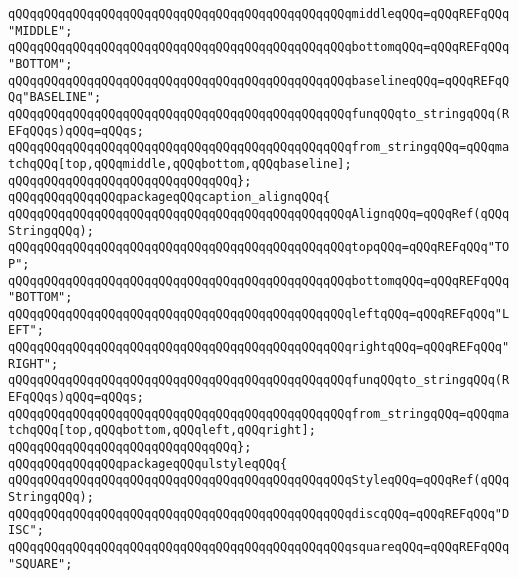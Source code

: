 \verb|qQQqqQQqqQQqqQQqqQQqqQQqqQQqqQQqqQQqqQQqqQQqqQQqmiddleqQQq=qQQqREFqQQq"MIDDLE";|\newline
\verb|qQQqqQQqqQQqqQQqqQQqqQQqqQQqqQQqqQQqqQQqqQQqqQQqbottomqQQq=qQQqREFqQQq"BOTTOM";|\newline
\verb|qQQqqQQqqQQqqQQqqQQqqQQqqQQqqQQqqQQqqQQqqQQqqQQqbaselineqQQq=qQQqREFqQQq"BASELINE";|\newline
\verb|qQQqqQQqqQQqqQQqqQQqqQQqqQQqqQQqqQQqqQQqqQQqqQQqfunqQQqto_stringqQQq(REFqQQqs)qQQq=qQQqs;|\newline
\verb|qQQqqQQqqQQqqQQqqQQqqQQqqQQqqQQqqQQqqQQqqQQqqQQqfrom_stringqQQq=qQQqmatchqQQq[top,qQQqmiddle,qQQqbottom,qQQqbaseline];|\newline
\verb|qQQqqQQqqQQqqQQqqQQqqQQqqQQqqQQq};|\newline
\newline
\verb|qQQqqQQqqQQqqQQqpackageqQQqcaption_alignqQQq{|\newline
\newline
\verb|qQQqqQQqqQQqqQQqqQQqqQQqqQQqqQQqqQQqqQQqqQQqqQQqAlignqQQq=qQQqRef(qQQqStringqQQq);|\newline
\verb|qQQqqQQqqQQqqQQqqQQqqQQqqQQqqQQqqQQqqQQqqQQqqQQqtopqQQq=qQQqREFqQQq"TOP";|\newline
\verb|qQQqqQQqqQQqqQQqqQQqqQQqqQQqqQQqqQQqqQQqqQQqqQQqbottomqQQq=qQQqREFqQQq"BOTTOM";|\newline
\verb|qQQqqQQqqQQqqQQqqQQqqQQqqQQqqQQqqQQqqQQqqQQqqQQqleftqQQq=qQQqREFqQQq"LEFT";|\newline
\verb|qQQqqQQqqQQqqQQqqQQqqQQqqQQqqQQqqQQqqQQqqQQqqQQqrightqQQq=qQQqREFqQQq"RIGHT";|\newline
\verb|qQQqqQQqqQQqqQQqqQQqqQQqqQQqqQQqqQQqqQQqqQQqqQQqfunqQQqto_stringqQQq(REFqQQqs)qQQq=qQQqs;|\newline
\verb|qQQqqQQqqQQqqQQqqQQqqQQqqQQqqQQqqQQqqQQqqQQqqQQqfrom_stringqQQq=qQQqmatchqQQq[top,qQQqbottom,qQQqleft,qQQqright];|\newline
\verb|qQQqqQQqqQQqqQQqqQQqqQQqqQQqqQQq};|\newline
\newline
\verb|qQQqqQQqqQQqqQQqpackageqQQqulstyleqQQq{|\newline
\newline
\verb|qQQqqQQqqQQqqQQqqQQqqQQqqQQqqQQqqQQqqQQqqQQqqQQqStyleqQQq=qQQqRef(qQQqStringqQQq);|\newline
\verb|qQQqqQQqqQQqqQQqqQQqqQQqqQQqqQQqqQQqqQQqqQQqqQQqdiscqQQq=qQQqREFqQQq"DISC";|\newline
\verb|qQQqqQQqqQQqqQQqqQQqqQQqqQQqqQQqqQQqqQQqqQQqqQQqsquareqQQq=qQQqREFqQQq"SQUARE";|\newline
